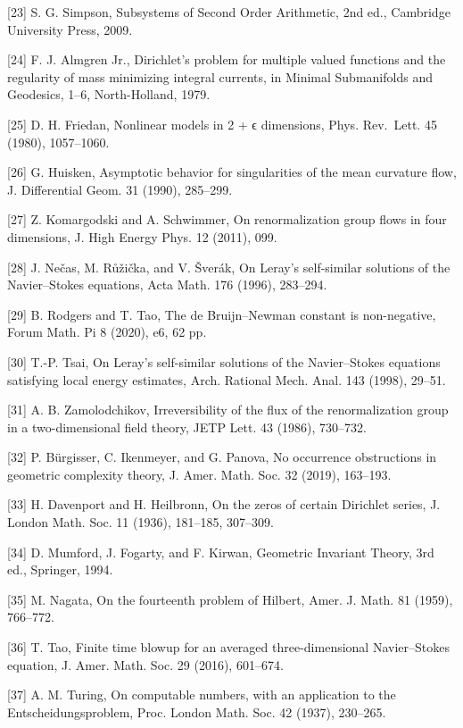 \documentclass[10pt,twocolumn]{article}
\begin{document}
{[}23{]} S. G. Simpson, Subsystems of Second Order Arithmetic, 2nd ed.,
Cambridge University Press, 2009.

{[}24{]} F. J. Almgren Jr., Dirichlet's problem for multiple valued
functions and the regularity of mass minimizing integral currents, in
Minimal Submanifolds and Geodesics, 1--6, North-Holland, 1979.

{[}25{]} D. H. Friedan, Nonlinear models in 2 + ϵ dimensions, Phys.
Rev.~Lett. 45 (1980), 1057--1060.

{[}26{]} G. Huisken, Asymptotic behavior for singularities of the mean
curvature flow, J. Differential Geom. 31 (1990), 285--299.

{[}27{]} Z. Komargodski and A. Schwimmer, On renormalization group flows
in four dimensions, J. High Energy Phys. 12 (2011), 099.

{[}28{]} J. Nečas, M. Růžička, and V. Šverák, On Leray's self-similar
solutions of the Navier--Stokes equations, Acta Math. 176 (1996),
283--294.

{[}29{]} B. Rodgers and T. Tao, The de Bruijn--Newman constant is
non-negative, Forum Math. Pi 8 (2020), e6, 62 pp.

{[}30{]} T.-P. Tsai, On Leray's self-similar solutions of the
Navier--Stokes equations satisfying local energy estimates, Arch.
Rational Mech. Anal. 143 (1998), 29--51.

{[}31{]} A. B. Zamolodchikov, Irreversibility of the flux of the
renormalization group in a two-dimensional field theory, JETP Lett. 43
(1986), 730--732.

{[}32{]} P. Bürgisser, C. Ikenmeyer, and G. Panova, No occurrence
obstructions in geometric complexity theory, J. Amer. Math. Soc. 32
(2019), 163--193.

{[}33{]} H. Davenport and H. Heilbronn, On the zeros of certain
Dirichlet series, J. London Math. Soc. 11 (1936), 181--185, 307--309.

{[}34{]} D. Mumford, J. Fogarty, and F. Kirwan, Geometric Invariant
Theory, 3rd ed., Springer, 1994.

{[}35{]} M. Nagata, On the fourteenth problem of Hilbert, Amer. J. Math.
81 (1959), 766--772.

{[}36{]} T. Tao, Finite time blowup for an averaged three-dimensional
Navier--Stokes equation, J. Amer. Math. Soc. 29 (2016), 601--674.

{[}37{]} A. M. Turing, On computable numbers, with an application to the
Entscheidungsproblem, Proc. London Math. Soc. 42 (1937), 230--265.
\end{document}
